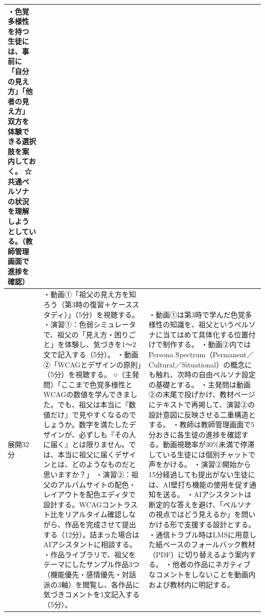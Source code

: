 \documentclass[uplatex,a4paper,11pt]{jsarticle}
\begin{document}
{\begin{longtable}{|>{\centering\arraybackslash}m{14mm}|p{72mm}|p{68mm}|}
    ・色覚多様性を持つ生徒には、事前に「自分の見え方」「他者の見え方」双方を体験できる選択肢を案内しておく。\newline
    ☆共通ペルソナの状況を理解しようとしている。（教師管理画面で進捗を確認） \\ \hline
  展開\newline32分 &
    ・動画①「祖父の見え方を知ろう（第3時の復習＋ケーススタディ）」（5分）を視聴する。\newline
    ・演習①：色弱シミュレータで、祖父の「見え方・困りごと」を体験し、気づきを1〜2文で記入する（5分）。\newline
    ・動画②「WCAGとデザインの原則」（5分）を視聴する。\newline
    ○（主発問）「ここまで色覚多様性とWCAGの数値を学んできました。でも、祖父は本当に『数値だけ』で見やすくなるのでしょうか。数字を満たしたデザインが、必ずしも『その人に届く』とは限りません。では、本当に祖父に届くデザインとは、どのようなものだと思いますか？」\newline
    ・演習②：祖父のアルバムサイトの配色・レイアウトを配色エディタで設計する。WCAGコントラスト比をリアルタイム確認しながら、作品を完成させて提出する（12分）。詰まった場合はAIアシスタントに相談する。\newline
    ・作品ライブラリで、祖父をテーマにしたサンプル作品3つ（機能優先・感情優先・対話派の3軸）を閲覧し、各作品に気づきコメントを1文記入する（5分）。 &
    ・動画①は第3時で学んだ色覚多様性の知識を、祖父というペルソナに当てはめて具体化する位置付けで制作する。\newline
    ・動画②内ではPersona Spectrum（Permanent／Cultural／Situational）の概念にも触れ、次時の自由ペルソナ設定の基礎とする。\newline
    ・主発問は動画②の末尾で投げかけ、教材ページにテキストで再掲して、演習②の設計意図に反映させる二重構造とする。\newline
    ・教師は教師管理画面で5分おきに各生徒の進捗を確認する。動画視聴率が30\%未満で停滞している生徒には個別チャットで声をかける。\newline
    ・演習②開始から15分経過しても提出がない生徒には、AI壁打ち機能の使用を促す通知を送る。\newline
    ・AIアシスタントは断定的な答えを避け、「ペルソナの視点ではどう見えるか」を問いかける形で支援する設計とする。\newline
    ・通信トラブル時はLMSに用意した紙ベースのフォールバック教材（PDF）に切り替えるよう案内する。\newline
    ・他者の作品にネガティブなコメントをしないことを動画内および教材内に明記する。\newline

\end{longtable}}
\end{document}
